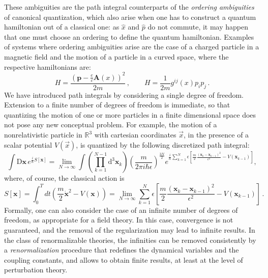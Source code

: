 These ambiguities are the path integral counterparts of the \textit{ordering ambiguities} of canonical quantization, which also arise when one has to construct a quantum hamiltonian out of a classical one: as $\hat{x}$ and $\hat{p}$ do not commute, it may happen that one must choose an ordering to define the quantum hamiltonian. Examples of systems where ordering ambiguities arise are the case of a charged particle in a magnetic field and the motion of a particle in a curved space, where the respective hamiltonians are:
\[
    H = \frac{(\mathbf{p} - \frac{e}{c}\mathbf{A}(x))^2}{2m} \,, \qquad H = \frac{1}{2m}g^{ij}(x)p_i p_j \,.
\]
We have introduced path integrals by considering a single degree of freedom. Extension to a finite number of degrees of freedom is immediate, so that quantizing the motion of one or more particles in a finite dimensional space does not pose any new conceptual problem. For example, the motion of a nonrelativistic particle in $\mathbb{R}^3$ with cartesian coordinates $\vec{x}$, in the presence of a scalar potential $V(\vec{x})$, is quantized by the following discretized path integral:
\[
    \int \mathrm{D} \mathbf{x} \, e^{\frac{i}{\hbar} S[\mathbf{x}]} = \lim_{N \to \infty} \int \left( \prod_{k=1}^{N-1} \mathrm{d}^3 \mathbf{x}_k \right) \left( \frac{m}{2\pi i \hbar \epsilon} \right)^{\frac{3N}{2}} e^{\frac{i}{\hbar} \sum_{k=1}^N \epsilon \left[ \frac{m}{2} \frac{(\mathbf{x}_k - \mathbf{x}_{k-1})^2}{\epsilon^2} - V(\mathbf{x}_{k-1}) \right]},
\]
where, of course, the classical action is
\[
    S[\mathbf{x}] = \int_0^T dt \left( \frac{m}{2} \dot{\mathbf{x}}^2 - V(\mathbf{x}) \right) = \lim_{N \to \infty} \sum_{k=1}^N \epsilon \left[ \frac{m}{2} \frac{(\mathbf{x}_k - \mathbf{x}_{k-1})^2}{\epsilon^2} - V(\mathbf{x}_{k-1}) \right] \,.
\]
Formally, one can also consider the case of an infinite number of degrees of freedom, as appropriate for a field theory. In this case, convergence is not guaranteed, and the removal of the regularization may lead to infinite results. In the class of renormalizable theories, the infinities can be removed consistently by a \textit{renormalization} procedure that redefines the dynamical variables and the coupling constants, and allows to obtain finite results, at least at the level of perturbation theory.